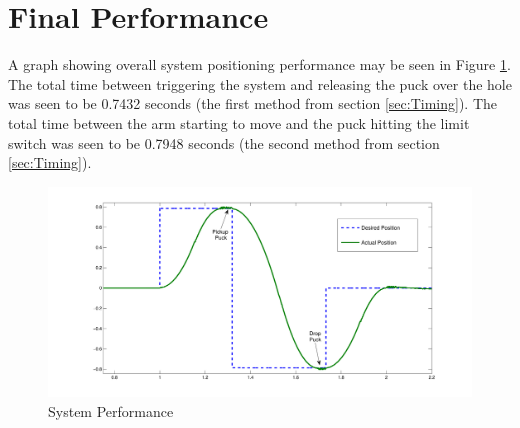 \section{Final Performance}
\label{sec:Performance}

A graph showing overall system positioning performance may be seen in Figure \ref{fig:performance}.
The total time between triggering the system and releasing the puck over the hole was seen to be 0.7432 seconds (the first method from section \ref{sec:Timing}).
The total time between the arm starting to move and the puck hitting the limit switch was seen to be 0.7948 seconds (the second method from section \ref{sec:Timing}).

\begin{figure}[htp]
    \centering
    \includegraphics[width=.95\textwidth]{images/Performace.pdf}
    \caption{System Performance}
    \label{fig:performance}
\end{figure}
